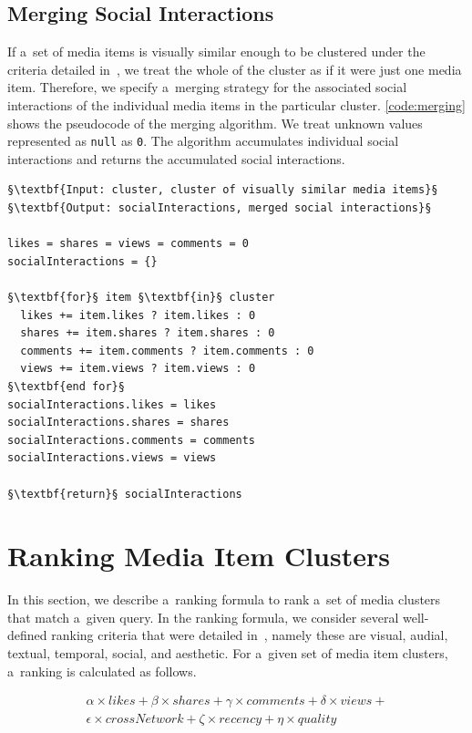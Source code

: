 \documentclass{sig-alternate}
\begin{document}
\subsection{Merging Social Interactions}
\label{sec:merging-social-interactions}

If a~set of media items is visually similar enough to be clustered
under the criteria detailed in~\cite{rizzo2012whatfresh},
we treat the whole of the cluster
as if it were just one media item.
Therefore, we specify a~merging strategy
for the associated social interactions of the individual media items
in the particular cluster.
\autoref{code:merging} shows the pseudocode of the merging algorithm.
We treat unknown values represented as \texttt{null} as \texttt{0}.
The algorithm accumulates individual social interactions
and returns the accumulated social interactions.

\begin{lstlisting}[caption=The social interactions merging algorithm,
  label=code:merging, float=b!]
§\textbf{Input: cluster, cluster of visually similar media items}§ 
§\textbf{Output: socialInteractions, merged social interactions}§ 

likes = shares = views = comments = 0
socialInteractions = {}

§\textbf{for}§ item §\textbf{in}§ cluster
  likes += item.likes ? item.likes : 0
  shares += item.shares ? item.shares : 0
  comments += item.comments ? item.comments : 0
  views += item.views ? item.views : 0
§\textbf{end for}§
socialInteractions.likes = likes
socialInteractions.shares = shares
socialInteractions.comments = comments
socialInteractions.views = views

§\textbf{return}§ socialInteractions
\end{lstlisting}

\section{Ranking Media Item Clusters}

In this section, we describe a~ranking formula to rank
a~set of media clusters that match a~given query.
In the ranking formula, we consider several well-defined ranking criteria
that were detailed in~\cite{steiner2012definingaesthetic},
namely these are visual, audial, textual, temporal, social, and aesthetic.
For a~given set of media item clusters, a~ranking is calculated as follows.

\begin{gather}
  \alpha \times \mathit{likes} + \beta \times \mathit{shares} +
  \gamma \times \mathit{comments} + \delta \times \mathit{views} + \nonumber\\
  \epsilon \times \mathit{crossNetwork} + \zeta \times \mathit{recency} +
  \eta \times \mathit{quality}
\end{gather}
\end{document}
